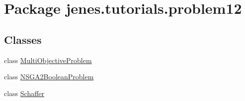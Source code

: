\hypertarget{namespacejenes_1_1tutorials_1_1problem12}{\section{Package jenes.\-tutorials.\-problem12}
\label{namespacejenes_1_1tutorials_1_1problem12}
}
\subsection*{Classes}
\begin{DoxyCompactItemize}
\item 
class \hyperlink{classjenes_1_1tutorials_1_1problem12_1_1_multi_objective_problem}{Multi\-Objective\-Problem}
\item 
class \hyperlink{classjenes_1_1tutorials_1_1problem12_1_1_n_s_g_a2_boolean_problem}{N\-S\-G\-A2\-Boolean\-Problem}
\item 
class \hyperlink{classjenes_1_1tutorials_1_1problem12_1_1_schaffer}{Schaffer}
\end{DoxyCompactItemize}
